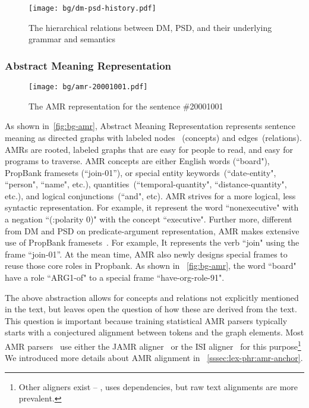 \begin{figure}[!th]
  \centering
  \texttt{[image: bg/dm-psd-history.pdf]}
\caption{\label{fig:dm-psd-history}The hierarchical relations between
  DM, PSD, and their underlying grammar and semantics}
\end{figure}


\subsubsection{Abstract Meaning Representation}
\label{ssec:bg:amr}
%
\begin{figure}[!th]
\centering
\texttt{[image: bg/amr-20001001.pdf]}
\caption{\label{fig:bg-amr }The AMR representation for the sentence
  \#20001001}
\end{figure}

As shown in~\autoref{fig:bg-amr}, Abstract Meaning Representation
represents sentence meaning as directed graphs with labeled nodes
~(concepts) and edges~(relations). AMRs are rooted, labeled graphs
that are easy for people to read, and easy for programs to traverse.
AMR concepts are either English words (``board"), PropBank framesets
(“join-01”), or special entity keywords~(``date-entity", ``person",
``name", etc.), quantities~(``temporal-quantity",
``distance-quantity", etc.), and logical conjunctions~(``and", etc).
AMR strives for a more logical, less syntactic representation.  For
example, it represent the word ``nonexecutive" with a negation
``(:polarity 0)" with the concept ``executive". Further more,
different from DM and PSD on predicate-argument representation, AMR
makes extensive use of PropBank framesets~\citep{Kin:Pal:02,
  palmer2005proposition}. For example, It represents the verb ``join"
using the frame “join-01”. At the mean time, AMR also newly designs
special frames to reuse those core roles in Propbank. As shown in
~\autoref{fig:bg-amr}, the word ``board" have a role ``ARG1-of" to a
special frame ``have-org-role-91".

The above abstraction allows for concepts and relations not explicitly
mentioned in the text, but leaves open the question of how these are
derived from the text. This question is important because training
statistical AMR parsers typically starts with a conjectured alignment
between tokens and the graph elements. Most AMR
parsers~\cite[\eg][]{Flanigan:2014vc,Wang:2015uo,Artzi:2009tb,Pust:2015ug,Peng:2015tj,Konstas:2017uj,Wang:2017vt}
use either the JAMR aligner~\cite{Flanigan:2014vc} or the ISI
aligner~\cite{Pourdamghani:2014aligning} for this
purpose\footnote{Other aligners exist -- \eg,
  \citet{chen2017unsupervised} uses dependencies, but raw text
  alignments are more prevalent.}  We introduced more details about
AMR alignment in ~\autoref{sssec:lex-phr:amr-anchor}.


